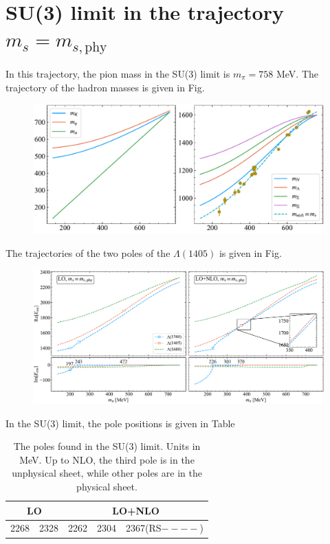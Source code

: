 \documentclass[a4paper,12pt]{article}
\begin{document}
\section{SU(3) limit in the trajectory $m_s=m_{s,\mathrm{phy}}$}
In this trajectory, the pion mass in the SU(3) limit is $m_\pi=758$ MeV. The trajectory of the hadron masses is given in Fig.
	\begin{figure}[!htpb]
		\includegraphics[width=\textwidth]{figure/mh_msphy.pdf}
	\end{figure}
	
	
The trajectories of the two poles of the $\Lambda(1405)$ is given in Fig.

\begin{figure}[!hptb]
	\includegraphics[width=\textwidth]{figure/trajectory_msphy.pdf}
\end{figure}

In the SU(3) limit, the pole positions is given in Table

\begin{table}[!htpb]
\caption{The poles found in the SU(3) limit. Units in MeV. Up to NLO, the third pole is in the unphysical sheet, while other poles are in the physical sheet.}
\begin{centering}

\begin{tabular}{|c|c|c|c|c|}
\hline 
\multicolumn{2}{|c|}{LO} & \multicolumn{3}{c|}{LO+NLO}\tabularnewline
\hline 
\hline 
2268 & 2328 & 2262 & 2304 & 2367(RS$----$)\tabularnewline
\hline 
\end{tabular}
\par\end{centering}
\end{table}
\end{document}
